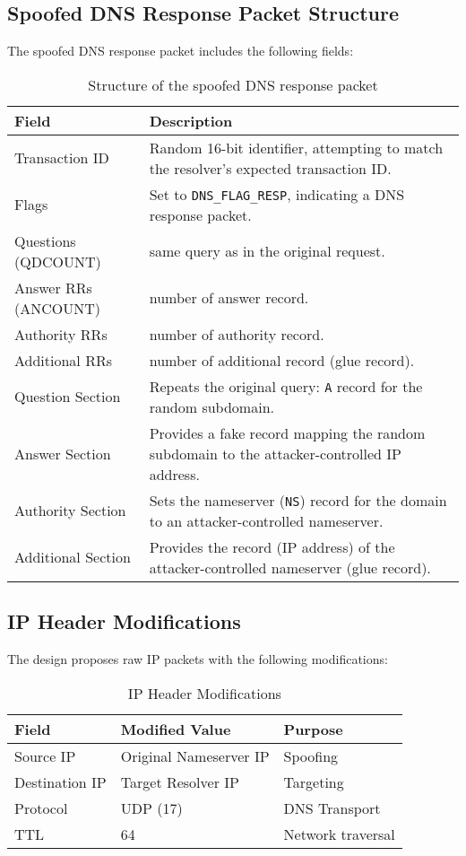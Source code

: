 \documentclass[12pt,a4paper]{article}
\begin{document}
\vspace{1em}

\subsection{Spoofed DNS Response Packet Structure}

The spoofed DNS response packet includes the following fields\cite{cert-dns}:

\begin{table}[H]
\centering
\begin{tabular}{|l|p{8cm}|}
\hline
\textbf{Field} & \textbf{Description} \\
\hline
Transaction ID & Random 16-bit identifier, attempting to match the resolver’s expected transaction ID. \\
\hline
Flags & Set to \texttt{DNS\_FLAG\_RESP}, indicating a DNS response packet. \\
\hline
Questions (QDCOUNT) & same query as in the original request. \\
\hline
Answer RRs (ANCOUNT) & number of answer record. \\
\hline
Authority RRs & number of authority record. \\
\hline
Additional RRs & number of  additional record (glue record). \\
\hline
Question Section & Repeats the original query: \texttt{A} record for the random subdomain. \\
\hline
Answer Section & Provides a fake  record mapping the random subdomain to the attacker-controlled IP address. \\
\hline
Authority Section & Sets the nameserver (\texttt{NS}) record for the domain to an attacker-controlled nameserver. \\
\hline
Additional Section & Provides the record (IP address) of the attacker-controlled nameserver (glue record). \\
\hline
\end{tabular}
\caption{Structure of the spoofed DNS response packet}
\end{table}


\subsection{IP Header Modifications}

The design proposes raw IP packets with the following modifications:

\begin{table}[H]
\centering
\begin{tabular}{|l|l|l|}
\hline
\textbf{Field} & \textbf{Modified Value} & \textbf{Purpose} \\
\hline
Source IP & Original Nameserver IP & Spoofing \\
Destination IP & Target Resolver IP & Targeting \\
Protocol & UDP (17) & DNS Transport \\
TTL & 64 & Network traversal \\
\hline
\end{tabular}
\caption{IP Header Modifications}
\label{tab:ip_header}
\end{table}
\end{document}
